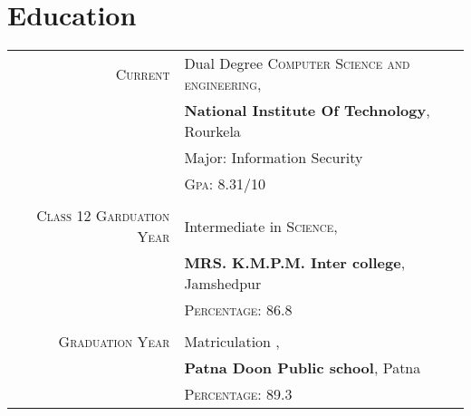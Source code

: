 \documentclass[a4paper,10pt]{article}
\begin{document}
\section{Education}
\begin{tabular}{rl}	
 \textsc{Current} & Dual Degree \textsc{Computer Science and engineering},\\ & \textbf{National Institute Of Technology}, Rourkela\\ & Major: Information Security\\
 & \normalsize \textsc{Gpa}: 8.31/10 \\ \\
 \textsc{Class 12 Garduation Year} & Intermediate in \textsc{Science},\\ & \textbf{MRS. K.M.P.M. Inter college}, Jamshedpur\\
&\normalsize \textsc{Percentage}: 86.8
\\ \\
\textsc{Graduation Year} & Matriculation ,\\ & \textbf{Patna Doon Public school}, Patna\\
&\normalsize \textsc{Percentage}: 89.3
\end{tabular}

\end{document}
